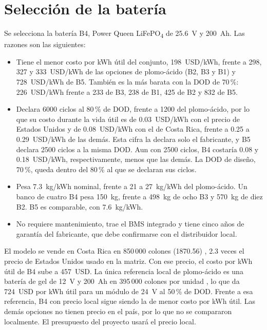 \section{Selección de la batería}\label{sec:seleccion}

Se selecciona la batería B4, Power Queen LiFePO\textsubscript{4} de \SI{25.6}{V} y \SI{200}{Ah}. Las razones son las siguientes:
\begin{itemize}
\item Tiene el menor costo por kWh útil del conjunto, \SI{198}{USD/kWh}, frente a 298, 327 y \SI{333}{USD/kWh} de las opciones de plomo-ácido (B2, B3 y B1) y \SI{728}{USD/kWh} de B5. También es la más barata con la DOD de 70\,\%: \SI{226}{USD/kWh} frente a 233 de B3, 238 de B1, 425 de B2 y 832 de B5.
\item Declara 6000 ciclos al 80\,\% de DOD, frente a 1200 del plomo-ácido, por lo que su costo durante la vida útil es de \SI{0.03}{USD/kWh} con el precio de Estados Unidos y de \SI{0.08}{USD/kWh} con el de Costa Rica, frente a 0.25 a \SI{0.29}{USD/kWh} de las demás. Esta cifra la declara solo el fabricante, y B5 declara 2500 ciclos a la misma DOD. Aun con 2500 ciclos, B4 costaría 0.08 y \SI{0.18}{USD/kWh}, respectivamente, menos que las demás. La DOD de diseño, 70\,\%, queda dentro del 80\,\% al que se declaran sus ciclos.
\item Pesa \SI{7.3}{kg/kWh} nominal, frente a 21 a \SI{27}{kg/kWh} del plomo-ácido. Un banco de cuatro B4 pesa \SI{150}{kg}, frente a \SI{498}{kg} de ocho B3 y \SI{570}{kg} de diez B2. B5 es comparable, con \SI{7.6}{kg/kWh}.
\item No requiere mantenimiento, trae el BMS integrado y tiene cinco años de garantía del fabricante, que debe confirmarse con el distribuidor local.
\end{itemize}

El modelo se vende en Costa Rica en 850\,000 colones (\SI{1870.56}{\USD}) \cite{kuat}, 2.3 veces el precio de Estados Unidos usado en la matriz. Con ese precio, el costo por kWh útil de B4 sube a \SI{457}{USD}. La única referencia local de plomo-ácido es una batería de gel de \SI{12}{V} y \SI{200}{Ah} en 395\,000 colones por unidad \cite{ledxpres_gel}, lo que da \SI{724}{USD} por kWh útil para un módulo de \SI{24}{V} al 50\,\% de DOD. Frente a esa referencia, B4 con precio local sigue siendo la de menor costo por kWh útil. Las demás opciones no tienen precio en el país, por lo que no se compararon localmente. El presupuesto del proyecto usará el precio local.


